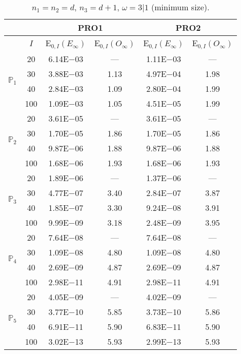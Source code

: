 \begin{table}[H]
\caption{$n_1=n_2=d$, $n_3=d+1$, $\omega=3|1$ (minimum size).}
\setlength{\tabcolsep}{5pt}
\centering
\begin{tabular}{@{}l c c c c c@{}}
\toprule
 &  & \multicolumn{2}{c}{PRO1} & \multicolumn{2}{c}{PRO2}\\
\midrule
 & $I$ & E$_{0,I}(E_{\infty})$ & E$_{0,I}(O_{\infty})$ & E$_{0,I}(E_{\infty})$ & E$_{0,I}(O_{\infty})$\\
\midrule
\multirow{4}{*}{$\mathbb{P}_{1}$}
 & 20 & 6.14E$-$03 & --- & 1.11E$-$03 & ---\\
 & 30 & 3.88E$-$03 & 1.13 & 4.97E$-$04 & 1.98 \\
 & 40 & 2.84E$-$03 & 1.09 & 2.80E$-$04 & 1.99 \\
 & 100 & 1.09E$-$03 & 1.05 & 4.51E$-$05 & 1.99 \\
\midrule
\multirow{4}{*}{$\mathbb{P}_{2}$}
 & 20 & 3.61E$-$05 & --- & 3.61E$-$05 & ---\\
 & 30 & 1.70E$-$05 & 1.86 & 1.70E$-$05 & 1.86 \\
 & 40 & 9.87E$-$06 & 1.88 & 9.87E$-$06 & 1.88 \\
 & 100 & 1.68E$-$06 & 1.93 & 1.68E$-$06 & 1.93 \\
\midrule
\multirow{4}{*}{$\mathbb{P}_{3}$}
 & 20 & 1.89E$-$06 & --- & 1.37E$-$06 & ---\\
 & 30 & 4.77E$-$07 & 3.40 & 2.84E$-$07 & 3.87 \\
 & 40 & 1.85E$-$07 & 3.30 & 9.24E$-$08 & 3.91 \\
 & 100 & 9.99E$-$09 & 3.18 & 2.48E$-$09 & 3.95 \\
\midrule
\multirow{4}{*}{$\mathbb{P}_{4}$}
 & 20 & 7.64E$-$08 & --- & 7.64E$-$08 & ---\\
 & 30 & 1.09E$-$08 & 4.80 & 1.09E$-$08 & 4.80 \\
 & 40 & 2.69E$-$09 & 4.87 & 2.69E$-$09 & 4.87 \\
 & 100 & 2.98E$-$11 & 4.91 & 2.98E$-$11 & 4.91 \\
\midrule
\multirow{4}{*}{$\mathbb{P}_{5}$}
 & 20 & 4.05E$-$09 & --- & 4.02E$-$09 & ---\\
 & 30 & 3.77E$-$10 & 5.85 & 3.73E$-$10 & 5.86 \\
 & 40 & 6.91E$-$11 & 5.90 & 6.83E$-$11 & 5.90 \\
 & 100 & 3.02E$-$13 & 5.93 & 2.99E$-$13 & 5.93 \\
\bottomrule
\end{tabular}
\label{Table:PRO:Rodrigo:Test8}
\end{table}
